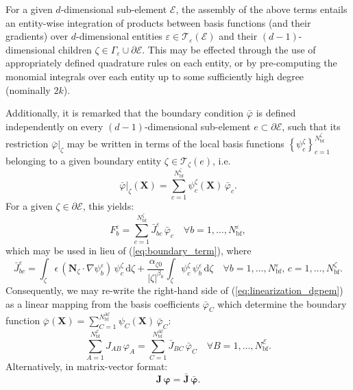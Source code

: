 	For a given $d$-dimensional sub-element $\mathcal{E}$, the assembly of the above terms entails an entity-wise integration of products between basis functions (and their gradients) over $d$-dimensional entities $\varepsilon \in \mathcal{T}_\varepsilon (\mathcal{E})$ and their $(d-1)$-dimensional children $\zeta \in \Gamma_\varepsilon \cup \partial \mathcal{E}$. This may be effected through the use of appropriately defined quadrature rules on each entity, or by pre-computing the monomial integrals over each entity up to some sufficiently high degree (nominally $2k$).
	
	Additionally, it is remarked that the boundary condition $\bar{\varphi}$ is defined independently on every $(d-1)$-dimensional sub-element $e \subset \partial \mathcal{E}$, such that its restriction $\bar{\varphi}|_\zeta$ may be written in terms of the local basis functions $\left\{ \psi^{\zeta}_c \right\}_{c=1}^{N^\zeta_{\mathrm b\mathrm f}}$ belonging to a given boundary entity $\zeta \in \mathcal{T}_{\zeta} (e)$, i.e.
	\begin{equation}
			\bar{\varphi}|_\zeta (\bm{X}) = \sum_{c=1}^{N^\zeta_{\mathrm b\mathrm f}} \psi^\zeta_c (\bm{X}) \, \bar{\varphi}_c.
	\end{equation}
	For a given $\zeta \in \partial \mathcal{E}$, this yields:
	\begin{equation}
		F^{\varepsilon}_b = \sum_{c=1}^{N^\zeta_{\mathrm b\mathrm f}} \bar{J}^{\varepsilon}_{bc} \, \bar{\varphi}_c \quad \forall b = 1, \ldots, N^{\varepsilon}_{\mathrm b\mathrm f},
	\end{equation}
	which may be used in lieu of (\ref{eq:boundary_term}), where
	\begin{equation}
		\bar{J}^{\varepsilon}_{bc} = \int_{\zeta} \epsilon \, (\bm{N}_{\zeta} \cdot \nabla \psi_b^{\varepsilon}) \, \psi^\zeta_c  \, \mathrm d \zeta + \frac{\alpha_{\zeta0}}{|\zeta|^{\beta_0}} \int_{\zeta} \psi^\zeta_c \, \psi_b^{\varepsilon} \, \mathrm d \zeta \quad \forall b = 1, \ldots, N^{\varepsilon}_{\mathrm b\mathrm f}, \, c = 1, \ldots, N^\zeta_{\mathrm b\mathrm f}.
	\end{equation}
	Consequently, we may re-write the right-hand side of (\ref{eq:linearization_dgpem}) as a linear mapping from the basis coefficients $\bar{\varphi}_C$ which determine the boundary function $\bar{\varphi} (\bm{X}) = \sum_{C=1}^{N^{\partial \mathcal{E}}_{\mathrm b\mathrm f}} \psi_C (\bm{X}) \, \bar{\varphi}_C$:
	\begin{equation}
		\sum_{A=1}^{N^{\mathcal{E}}_{\mathrm b\mathrm f}} J_{AB} \, \varphi_A = \sum_{C=1}^{N^{\partial \mathcal{E}}_{\mathrm b\mathrm f}} \bar{J}_{BC} \, \bar{\varphi}_C \quad \forall B = 1, \ldots, N^{\mathcal{E}}_{\mathrm b\mathrm f}.
	\end{equation}
	Alternatively, in matrix-vector format:
	\begin{equation}
		\bm{J} \, \boldsymbol{\varphi} = \bar{\bm{J}} \, \bar{\boldsymbol{\varphi}}.
		\label{eq:dgpem_linear_system}
	\end{equation}
	
